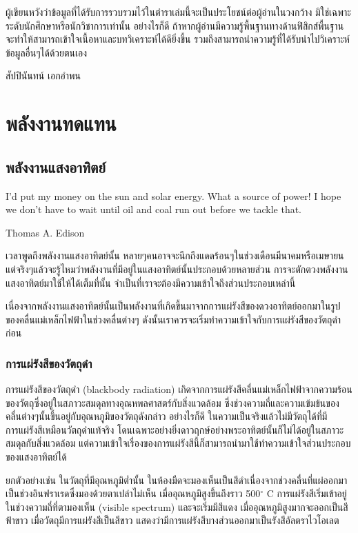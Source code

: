 \documentclass[a4paper,nobib,openany]{tufte-book}
\begin{document}
ผู้เขียนหวังว่าข้อมูลที่ได้รับการรวบรวมไว้ในตำราเล่มนี้จะเป็นประโยชน์ต่อผู้อ่านในวงกว้าง
มิใช่เฉพาะระดับนักศึกษาหรือนักวิชาการเท่านั้น อย่างไรก็ดี
ถ้าหากผู้อ่านมีความรู้พื้นฐานทางด้านฟิสิกส์พื้นฐาน
จะทำให้สามารถเข้าใจเนื้อหาและบทวิเคราะห์ได้ดียิ่งขึ้น
รวมถึงสามารถนำความรู้ที่ได้รับนำไปวิเคราะห์ข้อมูลอื่นๆได้ด้วยตนเอง

สัปปินันทน์ เอกอำพน

\listoffigures

\listoftables

\mainmatter


\part{พลังงานทดแทน}
\label{sec:orgf2c932a}
\chapter{พลังงานแสงอาทิตย์}
\label{sec:org972ee4a}

\epigraph{I'd put my money on the sun and solar energy. What a source of power! I hope we don't have to wait until oil and coal run out before we tackle that.}{Thomas A. Edison}

เวลาพูดถึงพลังงานแสงอาทิตย์นั้น
หลายๆคนอาจจะนึกถึงแดดร้อนๆในช่วงเดือนมีนาคมหรือเมษายน
แต่จริงๆแล้วจะรู้ไหมว่าพลังงานที่มีอยู่ในแสงอาทิตย์นั้นประกอบด้วยหลายส่วน
การจะตักตวงพลังงานแสงอาทิตย์มาใช้ให้ได้เต็มที่นั้น
จำเป็นที่เราจะต้องมีความเข้าใจถึงส่วนประกอบเหล่านี้

เนื่องจากพลังงานแสงอาทิตย์นั้นเป็นพลังงานที่เกิดขึ้นมาจากการแผ่รังสีของดวงอาทิตย์ออกมาในรูปของคลื่นแม่เหล็กไฟฟ้าในช่วงคลื่นต่างๆ
ดังนั้นเราควรจะเริ่มทำความเข้าใจกับการแผ่รังสีของวัตถุดำก่อน

\section{การแผ่รังสีของวัตถุดำ}
\label{sec:orgdb49a6e}

การแผ่รังสีของวัตถุดำ (blackbody radiation) เกิดจากการแผ่รังสีคลื่นแม่เหล็กไฟฟ้าจากความร้อนของวัตถุซึ่งอยู่ในสภาวะสมดุลทางอุณหพลศาสตร์กับสิ่งแวดล้อม
ซึ่งช่วงความถี่และความเข้มข้นของคลื่นต่างๆนั้นขึ้นอยู่กับอุณหภูมิของวัตถุดังกล่าว
อย่างไรก็ดี
ในความเป็นจริงแล้วไม่มีวัตถุได้ที่มีการแผ่รังสีเหมือนวัตถุดำแท้จริง
โดนเฉพาะอย่างยิ่งดาวฤกษ์อย่างพระอาทิตย์นั้นก็ไม่ได้อยู่ในสภาวะสมดุลกับสิ่งแวดล้อม
แต่ความเข้าใจเรื่องของการแผ่รังสีนี้ก็สามารถนำมาใช้ทำความเข้าใจส่วนประกอบของแสงอาทิตย์ได้

ยกตัวอย่างเช่น ในวัตถุที่มีอุณหภูมิต่ำนั้น
ในห้องมืดจะมองเห็นเป็นสีดำเนื่องจากช่วงคลื่นที่แผ่ออกมาเป็นช่วงอินฟราเรดซึ่งมองด้วยตาเปล่าไม่เห็น
เมื่ออุณหภูมิสูงขึ้นถึงราว 500\(^{\circ}\) C
การแผ่รังสีเริ่มเข้าอยู่ในช่วงความถี่ที่ตามองเห็น (visible spectrum)
และจะเริ่มมีสีแดง เมื่ออุณหภูมิสูงมากจะออกเป็นสีฟ้าขาว
เมื่อวัตถุมีการแผ่รังสีเป็นสีขาว
แสดงว่ามีการแผ่รังสีบางส่วนออกมาเป็นรังสีอัลตราไวโอเลต
\end{document}
